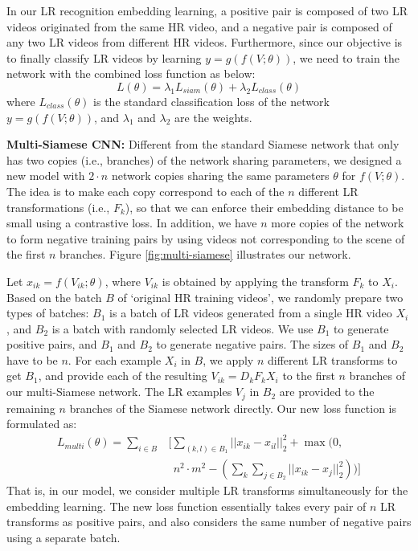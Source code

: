 \documentclass[letterpaper]{article} %
\begin{document}
In our LR recognition embedding learning, a positive pair is composed of two LR videos originated from the same HR video, and a negative pair is composed of any two LR videos from different HR videos. Furthermore, since our objective is to finally classify LR videos by learning $y = g(f(V; \theta))$, we need to train the network with the combined loss function as below:
\begin{equation}
\label{eq:combined-loss}
L(\theta)= \lambda_1 L_{siam}(\theta) + \lambda_2 L_{class}(\theta)
\end{equation}
where $L_{class}(\theta)$ is the standard classification loss of the network $y = g(f(V ; \theta))$, and $\lambda_1$ and $\lambda_2$ are the weights.


{\flushleft\textbf{Multi-Siamese CNN:} Different from the standard Siamese network that only has two copies (i.e., branches) of the network sharing parameters, we designed a new model with $2 \cdot n$ network copies sharing the same parameters $\theta$ for $f(V ; \theta)$. The idea is to make each copy correspond to each of the $n$ different LR transformations (i.e., $F_k$), so that we can enforce their embedding distance to be small using a contrastive loss. In addition, we have $n$ more copies of the network to form negative training pairs by using videos not corresponding to the scene of the first $n$ branches. Figure \ref{fig:multi-siamese} illustrates our network.}

Let $x_{ik} = f(V_{ik} ; \theta)$, where $V_{ik}$ is obtained by applying the transform $F_k$ to $X_i$. Based on the batch $B$ of `original HR training videos', we randomly prepare two types of batches: $B_1$ is a batch of LR videos generated from a single HR video $X_i$, and $B_2$ is a batch with randomly selected LR videos. We use $B_1$ to generate positive pairs, and $B_1$ and $B_2$ to generate negative pairs. The sizes of $B_1$ and $B_2$ have to be $n$. For each example $X_i$ in $B$, we apply $n$ different LR transforms to get $B_1$, and provide each of the resulting $V_{ik} = D_k F_k X_i$ to the first $n$ branches of our multi-Siamese network. The LR examples $V_j$ in $B_2$ are provided to the remaining $n$ branches of the Siamese network directly. Our new loss function is formulated as:
\begin{equation}
\begin{split}
L_{multi}(\theta) = \sum_{i \in B} &\Bigg[ \sum_{(k, l) \in B_1} ||x_{ik} - x_{il}||_2^2 + \max(0, \\
        &~~n^2 \cdot m^2 - ( \sum_{k}\sum_{j \in B_2} ||x_{ik} - x_j||_2^2 ))\Bigg]
\end{split}
\end{equation}
That is, in our model, we consider multiple LR transforms simultaneously for the embedding learning. The new loss function essentially takes every pair of $n$ LR transforms as positive pairs, and also considers the same number of negative pairs using a separate batch.
\end{document}
